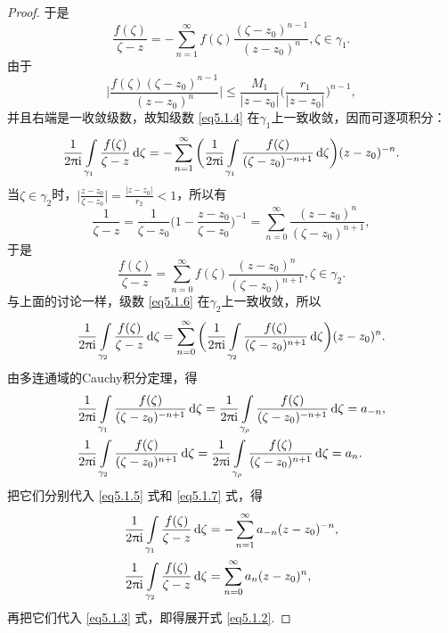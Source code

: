 \begin{proof}
  于是
  \begin{equation}\label{eq5.1.4}
    \frac{f(\zeta)}{\zeta-z} = -\sum_{n=1}^\infty f(\zeta)\frac{(\zeta-z_0)^{n-1}}{(z-z_0)^{n}}, \zeta\in\gamma_1.
  \end{equation}
  由于
  \[
    \bigg|\frac{f(\zeta)(\zeta-z_0)^{n-1}}{(z-z_0)^n}\bigg|
    \le\frac{M_1}{|z-z_0|}\bigg(\frac{r_1}{|z-z_0|}\bigg)^{n-1},
  \]
  并且右端是一收敛级数，故知级数 \eqref{eq5.1.4} 在$\gamma_1$上一致收敛，因而可逐项积分：
  \begin{equation}\label{eq5.1.5}
    \frac1{2\uppi\mathrm i}\int\limits_{\gamma_1}\frac{f(\zeta)}{\zeta-z}\mathop{}\!\mathrm{d} \zeta
    = -\sum_{n=1}^\infty\bigg(\frac1{2\uppi\mathrm i}\int\limits_{\gamma_1}
    \frac{f(\zeta)}{(\zeta-z_0)^{-n+1}}\mathop{}\!\mathrm{d} \zeta\bigg)(z-z_0)^{-n}.
  \end{equation}
  当$\zeta\in\gamma_2$时，$\bigg|\frac{z-z_0}{\zeta-z_0}\bigg|=\frac{|z-z_0|}{r_2}<1$，所以有
  \[
    \frac1{\zeta-z}=\frac1{\zeta-z_0}\bigg(1-\frac{z-z_0}{\zeta-z_0}\bigg)^{-1}
    =\sum_{n=0}^\infty\frac{(z-z_0)^n}{(\zeta-z_0)^{n+1}},
  \]
  于是
  \begin{equation}\label{eq5.1.6}
    \frac{f(\zeta)}{\zeta-z} = \sum_{n=0}^\infty f(\zeta)\frac{(z-z_0)^{n}}{(\zeta-z_0)^{n+1}},\zeta\in\gamma_2.
  \end{equation}
  与上面的讨论一样，级数 \eqref{eq5.1.6} 在$\gamma_2$上一致收敛，所以
  \begin{equation}\label{eq5.1.7}
    \frac1{2\uppi\mathrm i}\int\limits_{\gamma_2}\frac{f(\zeta)}{\zeta-z}\mathop{}\!\mathrm{d} \zeta
    =\sum_{n=0}^\infty\bigg(\frac1{2\uppi\mathrm i}\int\limits_{\gamma_2}
    \frac{f(\zeta)}{(\zeta-z_0)^{n+1}}\mathop{}\!\mathrm{d} \zeta\bigg)(z-z_0)^{n}.
  \end{equation}
  由多连通域的Cauchy积分定理，得
  \begin{align*}
    & \frac1{2\uppi\mathrm i}\int\limits_{\gamma_1}
      \frac{f(\zeta)}{(\zeta-z_0)^{-n+1}}\mathop{}\!\mathrm{d} \zeta
    = \frac1{2\uppi\mathrm i}\int\limits_{\gamma_\rho}
      \frac{f(\zeta)}{(\zeta-z_0)^{-n+1}}\mathop{}\!\mathrm{d} \zeta=a_{-n},\\
    & \frac1{2\uppi\mathrm i}\int\limits_{\gamma_2}
      \frac{f(\zeta)}{(\zeta-z_0)^{n+1}}\mathop{}\!\mathrm{d} \zeta
    = \frac1{2\uppi\mathrm i}\int\limits_{\gamma_\rho}
      \frac{f(\zeta)}{(\zeta-z_0)^{n+1}}\mathop{}\!\mathrm{d} \zeta=a_{n}.
  \end{align*}
  把它们分别代入 \eqref{eq5.1.5} 式和 \eqref{eq5.1.7} 式，得
  \begin{align*}
    & \frac1{2\uppi\mathrm i}\int\limits_{\gamma_1}\frac{f(\zeta)}{\zeta-z}\mathop{}\!\mathrm{d} \zeta
    = -\sum_{n=1}^\infty a_{-n}(z-z_0)^{-n},\\
    & \frac1{2\uppi\mathrm i}\int\limits_{\gamma_2}\frac{f(\zeta)}{\zeta-z}\mathop{}\!\mathrm{d} \zeta
    = \sum_{n=0}^\infty a_n(z-z_0)^n,
  \end{align*}
  再把它们代入 \eqref{eq5.1.3} 式，即得展开式 \eqref{eq5.1.2}.


\end{proof}
